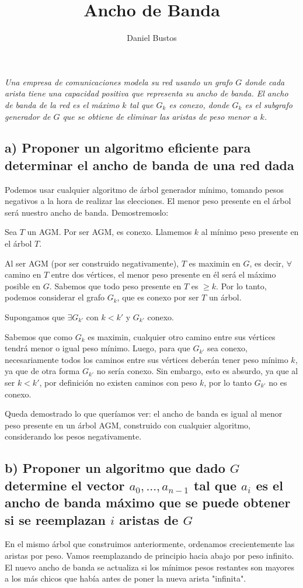 \documentclass{article}
\title{Ancho de Banda}
\author{Daniel Bustos}
\begin{document}
\maketitle

\textit{Una empresa de comunicaciones modela su red usando un grafo \(G\) donde cada arista tiene una
capacidad positiva que representa su ancho de banda. El ancho de banda de la red es el máximo
\(k\) tal que \(G_k\) es conexo, donde \(G_k\) es el subgrafo generador de \(G\) que se obtiene de eliminar las
aristas de peso menor a \(k\).}

\subsection*{a) Proponer un algoritmo eficiente para determinar el ancho de banda de una red dada}

Podemos usar cualquier algoritmo de árbol generador mínimo, tomando pesos negativos a la hora de realizar las elecciones. El menor peso presente en el árbol será nuestro ancho de banda. Demostremoslo:

Sea \(T\) un AGM. Por ser AGM, es conexo. Llamemos \(k\) al mínimo peso presente en el árbol \(T\).

Al ser AGM (por ser construido negativamente), \(T\) es maximin en \(G\), es decir, \(\forall\) camino en \(T\) entre dos vértices, el menor peso presente en él será el máximo posible en \(G\). Sabemos que todo peso presente en \(T\) es \(\geq k\). Por lo tanto, podemos considerar el grafo \(G_k\), que es conexo por ser \(T\) un árbol.

Supongamos que \(\exists G_{k'}\) con \(k < k'\) y \(G_{k'}\) conexo.

Sabemos que como \(G_k\) es maximin, cualquier otro camino entre sus vértices tendrá menor o igual peso mínimo. Luego, para que \(G_{k'}\) sea conexo, necesariamente todos los caminos entre sus vértices deberán tener peso mínimo \(k\), ya que de otra forma \(G_{k'}\) no sería conexo. Sin embargo, esto es absurdo, ya que al ser \(k < k'\), por definición no existen caminos con peso \(k\), por lo tanto \(G_{k'}\) no es conexo.

Queda demostrado lo que queríamos ver: el ancho de banda es igual al menor peso presente en un árbol AGM, construido con cualquier algoritmo, considerando los pesos negativamente.

\subsection*{b) Proponer un algoritmo que dado \(G\) determine el vector \(a_0, \ldots, a_{n-1}\) tal que \(a_i\) es el ancho de banda máximo que se puede obtener si se reemplazan \(i\) aristas de \(G\)}

En el mismo árbol que construimos anteriormente, ordenamos crecientemente las aristas por peso. Vamos reemplazando de principio hacia abajo por peso infinito. El nuevo ancho de banda se actualiza si los mínimos pesos restantes son mayores a los más chicos que había antes de poner la nueva arista "infinita".
\end{document}
